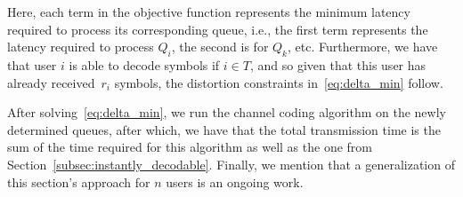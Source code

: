 %
Here, each term in the objective function represents the minimum latency required to process its corresponding queue, i.e., the first term represents the latency required to process $Q_i$, the second is for $Q_k$, etc.  Furthermore, we have that user $i$ is able to decode   symbols if $i \in T$, and so given that this user has already received~$r_i$ symbols, the distortion constraints in~\eqref{eq:delta_min} follow.  

After solving~\eqref{eq:delta_min}, we run the channel coding algorithm on the newly determined queues, after which, we have that the total transmission time is the sum of the time required for this algorithm as well as the one from Section~\ref{subsec:instantly_decodable}.  Finally, we mention that a generalization of this section's approach for $n$ users is an ongoing work.


